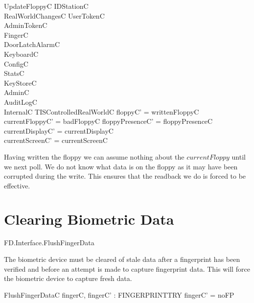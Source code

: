 \begin{schema}{UpdateFloppyC}
        \Delta IDStationC
\\      RealWorldChangesC
\also
        \Xi UserTokenC
\\      \Xi AdminTokenC
\\      \Xi FingerC
\\      \Xi DoorLatchAlarmC
\\      \Xi KeyboardC
\\      \Xi ConfigC
\\      \Xi StatsC
\\      \Xi KeyStoreC
\\      \Xi AdminC      
\\      \Xi AuditLogC
\\      \Xi InternalC
\also
	\Xi TISControlledRealWorldC
\where
	floppyC' = writtenFloppyC
\\      currentFloppyC' = badFloppyC
\also
        floppyPresenceC' = floppyPresenceC
\\      currentDisplayC' = currentDisplayC
\\      currentScreenC' = currentScreenC
\end{schema}
\begin{Zcomment}
\item
Having written the floppy we can assume nothing about the $currentFloppy$
until we next poll. We do not know what data is on the floppy as it
may have been corrupted during the write. This ensures that the
readback we do is forced to be effective. 
\end{Zcomment}


\section{Clearing Biometric Data}
\begin{traceunit}{FD.Interface.FlushFingerData}
\end{traceunit}

The biometric device must be cleared of stale data after a fingerprint
has been verified and before an attempt is made to capture fingerprint
data. This will force the biometric device to capture fresh data.

\begin{schema}{FlushFingerDataC}
        fingerC, fingerC' : FINGERPRINTTRY
\where
        fingerC' = noFP
\end{schema}

